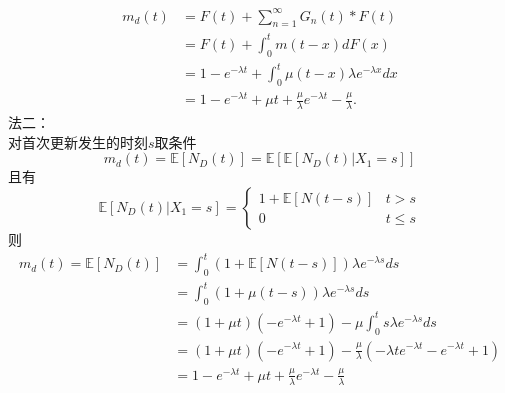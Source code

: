 \documentclass[UTF8]{ctexart}
\begin{document}
\begin{align*}
	m_d(t)&=F(t)+\sum_{n=1}^{\infty}G_n(t)*F(t)\\
	&=F(t)+\int_0^t m(t - x) dF(x)\\
	&=1-e^{-\lambda t}+\int_0^t \mu (t - x) \lambda e^{-\lambda x}dx\\
	&=1-e^{-\lambda t}+\mu t+\frac{\mu}{\lambda}e^{-\lambda t}-\frac{\mu}{\lambda}.
\end{align*}
法二：\\
对首次更新发生的时刻$s$取条件
$$
m_d(t)=\mathbb{E}[N_D(t)]=\mathbb{E}\left[\mathbb{E}[N_D(t)|X_1=s] \right] 
$$
且有
$$
\mathbb{E}[N_D(t)|X_1=s]=
\begin{cases}
	1+\mathbb{E}[N(t-s)]  &  t>s \\
0  &  t\le s
\end{cases}
$$
则
$$
\begin{aligned}
	m_d(t)=\mathbb{E}[N_D(t)]&=\int_{0}^{t} \left(1+\mathbb{E}[N(t-s)] \right) \lambda e^{-\lambda s}ds\\
	&=\int_{0}^{t} \left(1+\mu(t-s) \right) \lambda e^{-\lambda s}ds\\
	&=(1+\mu t)\left(-e^{-\lambda t}+1 \right) -\mu \int_{0}^{t} s\lambda e^{-\lambda s}ds \\
	&=(1+\mu t)\left(-e^{-\lambda t}+1 \right) -\frac{\mu}{\lambda}\left( -\lambda t e^{-\lambda t} -e^{-\lambda t}+1\right)\\
	&=1-e^{-\lambda t}+\mu t+\frac{\mu}{\lambda}e^{-\lambda t}-\frac{\mu}{\lambda}
\end{aligned}
$$
\end{document}

